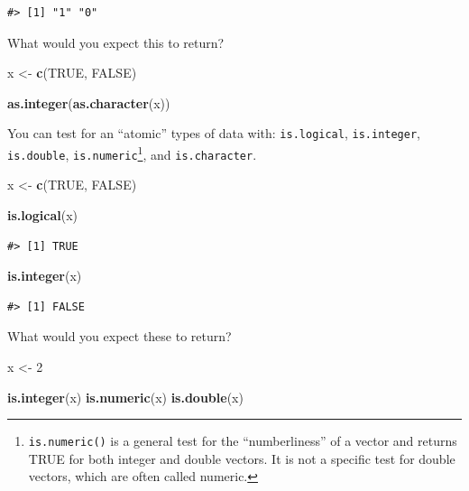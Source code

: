 \documentclass[]{book}
\newenvironment{Shaded}{\begin{snugshade}}{\end{snugshade}}
\newcommand{\KeywordTok}[1]{\textcolor[rgb]{0.13,0.29,0.53}{\textbf{#1}}}
\newcommand{\DecValTok}[1]{\textcolor[rgb]{0.00,0.00,0.81}{#1}}
\newcommand{\StringTok}[1]{\textcolor[rgb]{0.31,0.60,0.02}{#1}}
\newcommand{\OtherTok}[1]{\textcolor[rgb]{0.56,0.35,0.01}{#1}}
\newcommand{\NormalTok}[1]{#1}
\let\rmarkdownfootnote\footnote%
\def\footnote{\protect\rmarkdownfootnote}
\theoremstyle{definition}
\theoremstyle{definition}
\theoremstyle{definition}
\theoremstyle{remark}
\begin{document}
\begin{verbatim}
#> [1] "1" "0"
\end{verbatim}

What would you expect this to return?

\begin{Shaded}
\begin{Highlighting}[]
\NormalTok{x <-}\StringTok{ }\KeywordTok{c}\NormalTok{(}\OtherTok{TRUE}\NormalTok{, }\OtherTok{FALSE}\NormalTok{)}

\KeywordTok{as.integer}\NormalTok{(}\KeywordTok{as.character}\NormalTok{(x))}
\end{Highlighting}
\end{Shaded}

You can test for an ``atomic'' types of data with: \texttt{is.logical},
\texttt{is.integer}, \texttt{is.double}, \texttt{is.numeric}\footnote{\texttt{is.numeric()}
  is a general test for the ``numberliness'' of a vector and returns
  TRUE for both integer and double vectors. It is not a specific test
  for double vectors, which are often called numeric.}, and
\texttt{is.character}.

\begin{Shaded}
\begin{Highlighting}[]
\NormalTok{x <-}\StringTok{ }\KeywordTok{c}\NormalTok{(}\OtherTok{TRUE}\NormalTok{, }\OtherTok{FALSE}\NormalTok{)}

\KeywordTok{is.logical}\NormalTok{(x)}
\end{Highlighting}
\end{Shaded}

\begin{verbatim}
#> [1] TRUE
\end{verbatim}

\begin{Shaded}
\begin{Highlighting}[]
\KeywordTok{is.integer}\NormalTok{(x)}
\end{Highlighting}
\end{Shaded}

\begin{verbatim}
#> [1] FALSE
\end{verbatim}

What would you expect these to return?

\begin{Shaded}
\begin{Highlighting}[]
\NormalTok{x <-}\StringTok{ }\DecValTok{2}

\KeywordTok{is.integer}\NormalTok{(x)}
\KeywordTok{is.numeric}\NormalTok{(x)}
\KeywordTok{is.double}\NormalTok{(x)}
\end{Highlighting}
\end{Shaded}
\end{document}
